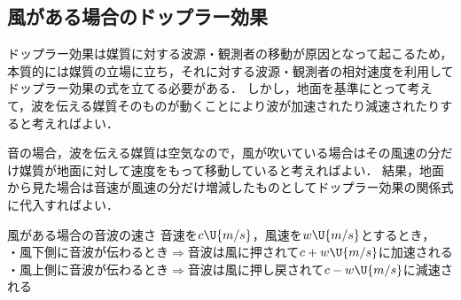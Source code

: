 \subsection{風がある場合のドップラー効果}

ドップラー効果は媒質に対する波源・観測者の移動が原因となって起こるため，本質的には媒質の立場に立ち，それに対する波源・観測者の相対速度を利用してドップラー効果の式を立てる必要がある．
しかし，地面を基準にとって考えて，波を伝える媒質そのものが動くことにより波が加速されたり減速されたりすると考えればよい．

音の場合，波を伝える媒質は空気なので，風が吹いている場合はその風速の分だけ媒質が地面に対して速度をもって移動していると考えればよい．
結果，地面から見た場合は音速が風速の分だけ増減したものとしてドップラー効果の関係式に代入すればよい．

\begin{matome}{風がある場合の音波の速さ}
\hspace{3mm} 音速を$c\U{m/s}$，風速を$w\U{m/s}$とするとき，\\
\hspace{5mm} ・風下側に音波が伝わるとき\hspace{2mm}$\Rightarrow$\hspace{2mm}音波は風に押されて$c+w\U{m/s}$に加速される\\
\hspace{5mm} ・風上側に音波が伝わるとき\hspace{2mm}$\Rightarrow$\hspace{2mm}音波は風に押し戻されて$c-w\U{m/s}$に減速される
\end{matome}

